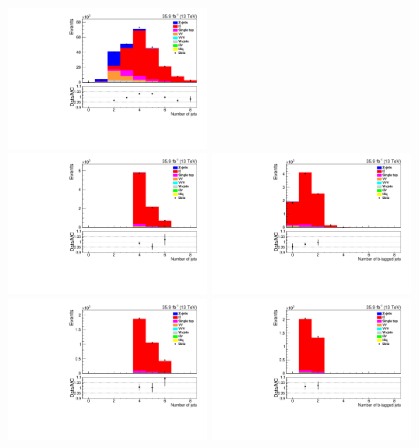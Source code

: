 \begin{figure}[h]
\centering
\hspace*{-7.3cm}\includegraphics[width=0.47\textwidth]{figs/background-estimation/plots/unblinded/ttbar_control/numbJets_SingleTop_lepSel_emu.pdf}
\\
\includegraphics[width=0.47\textwidth]{figs/background-estimation/plots/unblinded/ttbar_control/numbJets_SingleTop_jetSel_emu.pdf}
\includegraphics[width=0.47\textwidth]{figs/background-estimation/plots/unblinded/ttbar_control/numbBJets_SingleTop_jetSel_emu.pdf}
\\
\includegraphics[width=0.47\textwidth]{figs/background-estimation/plots/unblinded/ttbar_control/numbJets_SingleTop_wMass_emu.pdf}
\includegraphics[width=0.47\textwidth]{figs/background-estimation/plots/unblinded/ttbar_control/numbBJets_SingleTop_wMass_emu.pdf}

\end{figure}
